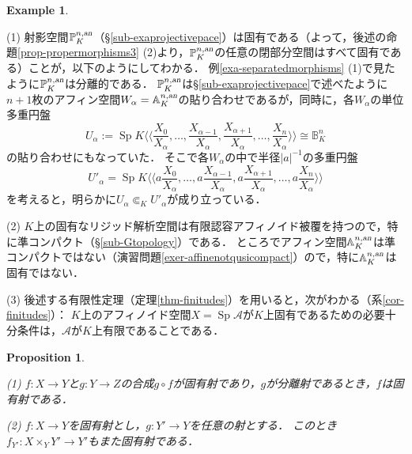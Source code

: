 \documentclass[a4paper,12pt, dvipdfmx]{jsbook}
\def\P{\mathbb{P}}
\def\A{\mathbb{A}}
\def\B{\mathbb{B}}
\def\Sp{\mathop{\mathrm{Sp}}\nolimits}
\def\an{\textsl{an}}
\def\dl{\langle\!\langle}
\def\dr{\rangle\!\rangle}
\newcommand{\abs}[1]{\lvert#1\rvert}
\theoremstyle{plain}
\newtheorem{prop}[thm]{\bfseries Proposition}
\theoremstyle{definition}
\newtheorem{exa}[thm]{\bfseries Example}
\begin{document}
\begin{exa}\label{exa-propermorphisms}{\rm 
(1) 射影空間$\P^{n,\an}_K$（\S\ref{sub-exaprojectivepace}）は固有である（よって，後述の命題\ref{prop-propermorphisms3} (2)より，$\P^{n,\an}_K$の任意の閉部分空間はすべて固有である）ことが，以下のようにしてわかる．
例\ref{exa-separatedmorphisms} (1)で見たように$\P^{n,\an}_K$は分離的である．
$\P^{n,\an}_K$は\S\ref{sub-exaprojectivepace}で述べたように$n+1$枚のアフィン空間$W_{\alpha}=\A^{n,\an}_K$の貼り合わせであるが，同時に，各$W_{\alpha}$の単位多重円盤
$$
U_{\alpha}:=\Sp K\dl {\textstyle \frac{X_0}{X_{\alpha}},\ldots,\frac{X_{\alpha-1}}{X_{\alpha}},\frac{X_{\alpha+1}}{X_{\alpha}},\ldots,\frac{X_n}{X_{\alpha}}}\dr\cong\B^n_K
$$
の貼り合わせにもなっていた．
そこで各$W_{\alpha}$の中で半径$\abs{a}^{-1}$の多重円盤
$$
U'_{\alpha}=\Sp K\dl {\textstyle a\frac{X_0}{X_{\alpha}},\ldots,a\frac{X_{\alpha-1}}{X_{\alpha}},a\frac{X_{\alpha+1}}{X_{\alpha}},\ldots,a\frac{X_n}{X_{\alpha}}}\dr
$$
を考えると，明らかに$U_{\alpha}\Subset_KU'_{\alpha}$が成り立っている．

(2) $K$上の固有なリジッド解析空間は有限認容アフィノイド被覆を持つので，特に準コンパクト（\S\ref{sub-Gtopology}）である．
ところでアフィン空間$\A^{n,\an}_K$は準コンパクトではない（演習問題\ref{exer-affinenotqusicompact}）ので，特に$\A^{n,\an}_K$は固有ではない．

(3) 後述する有限性定理（定理\ref{thm-finitudes}）を用いると，次がわかる（系\ref{cor-finitudes}）：
$K$上のアフィノイド空間$X=\Sp\mathcal{A}$が$K$上固有であるための必要十分条件は，$\mathcal{A}$が$K$上有限であることである．}
\end{exa}

\begin{prop}\label{prop-propermorphisms2}{\rm 
(1) $f\colon X\rightarrow Y$と$g\colon Y\rightarrow Z$の合成$g\circ f$が固有射であり，$g$が分離射であるとき，$f$は固有射である．

(2) $f\colon X\rightarrow Y$を固有射とし，$g\colon Y'\rightarrow Y$を任意の射とする．
このとき$f_{Y'}\colon X\times_YY'\rightarrow Y'$もまた固有射である．}
\end{prop}
\end{document}
